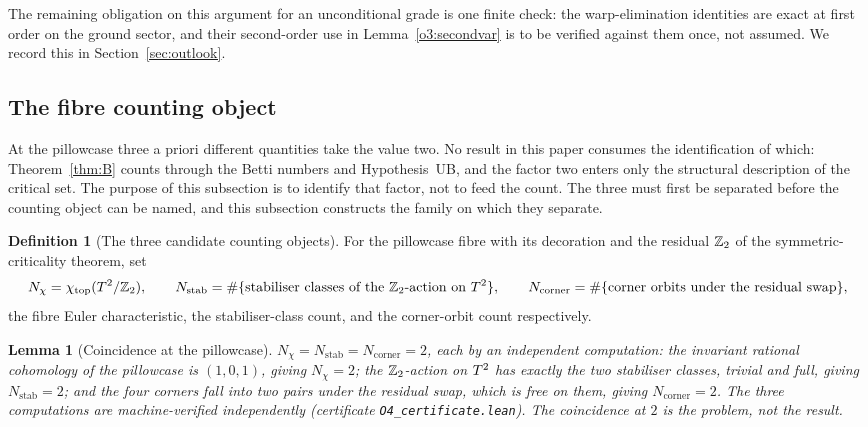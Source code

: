 \documentclass[11pt]{article}
\numberwithin{equation}{section}
\theoremstyle{plain}
\newtheorem{lemma}[theorem]{Lemma}
\theoremstyle{definition}
\newtheorem{definition}[theorem]{Definition}
\theoremstyle{remark}
\begin{document}
The remaining obligation on this argument for an unconditional
grade is one finite check: the warp-elimination identities are
exact at first order on the ground sector, and their second-order
use in Lemma~\ref{o3:secondvar} is to be verified against them
once, not assumed. We record this in
Section~\ref{sec:outlook}.

\subsection{The fibre counting object}\label{sec:two}

At the pillowcase three a priori different quantities take the
value two. No result in this paper consumes the identification of
which: Theorem~\ref{thm:B} counts through the Betti numbers and
Hypothesis~\textup{UB}, and the factor two enters only the
structural description of the critical set. The purpose of this
subsection is to identify that factor, not to feed the count. The
three must first be separated
before the counting object can be named, and this subsection
constructs the family on which they separate.

\begin{definition}[The three candidate counting
objects]\label{o4:objects}
For the pillowcase fibre with its decoration and the residual
$\mathbb{Z}_2$ of the symmetric-criticality theorem, set
\[
N_{\chi} = \chi_{\mathrm{top}}(T^2/\mathbb{Z}_2),
\qquad
N_{\mathrm{stab}} = \#\{\text{stabiliser classes of the
$\mathbb{Z}_2$-action on } T^2\},
\qquad
N_{\mathrm{corner}} = \#\{\text{corner orbits under the residual
swap}\},
\]
the fibre Euler characteristic, the stabiliser-class count, and the
corner-orbit count respectively.
\end{definition}

\begin{lemma}[Coincidence at the pillowcase]\label{o4:coincide}
$N_{\chi} = N_{\mathrm{stab}} = N_{\mathrm{corner}} = 2$, each by
an independent computation: the invariant rational cohomology of
the pillowcase is $(1, 0, 1)$, giving $N_{\chi} = 2$; the
$\mathbb{Z}_2$-action on $T^2$ has exactly the two stabiliser classes,
trivial and full, giving $N_{\mathrm{stab}} = 2$; and the four
corners fall into two pairs under the residual swap, which is free
on them, giving $N_{\mathrm{corner}} = 2$. The three computations
are machine-verified independently (certificate
\texttt{O4\_certificate.lean}). The coincidence at $2$ is the
problem, not the result.
\end{lemma}
\end{document}
